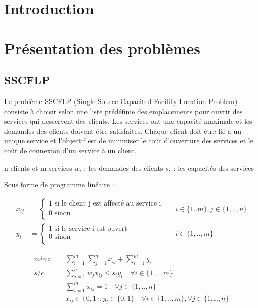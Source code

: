 \section{Introduction}

\section{Présentation des problèmes}

\subsection{SSCFLP}

Le problème SSCFLP (Single Source Capacited Facility Location Problem) consiste à choisir selon une liste prédéfinie des emplacements pour ouvrir des services qui desservent des clients. Les services ont une capacité maximale et les demandes des clients doivent être satisfaites. Chaque client doit être lié a un unique service et l'objectif est de minimiser le  coût d'ouverture des services et le coût de connexion d'un service à un client. \newline

n clients et m services
$w_i$ : les demandes des clients
$s_i$ : les capacités des services

Sous forme de programme linéaire :


\begin{align*}
x_{ij} &= \begin{cases}
        1 \text{ si le client j est affecté au service i}\\
        0 \text{ sinon} \\
    \end{cases}
&&i \in \{1..m\}, j \in \{1,..,n\} \\
y_i &= \begin{cases}
        1 \text{ si le service i est ouvert}\\
        0 \text{ sinon} \\
    \end{cases}
&&i \in \{1,..,m\}
\end{align*}



\begin{align}
min z = &\sum\limits_{i=1}^m \sum\limits_{j=1}^n x_{ij} + \sum\limits_{i=1}^m y_i \\
  s/c \quad &\sum\limits_{j=1}^n w_j x_{ij} \leq s_i y_i \quad \forall i \in \{1, .., m\} \\
            &\sum\limits_{i=1}^m x_{ij} = 1 \quad \forall j \in \{1, .., n\} \\
            &x_{ij} \in \{0,1\}, y_i \in \{0,1\} \quad \forall i \in \{1,..,m\}, \forall j \in \{1,..,n\}
\end{align}

